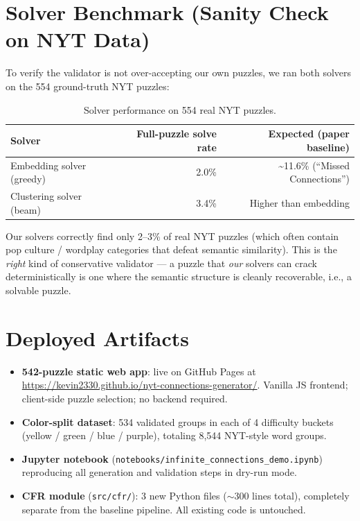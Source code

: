 \documentclass[11pt, letterpaper]{article}
\begin{document}
\section{Solver Benchmark (Sanity Check on NYT Data)}

To verify the validator is not over-accepting our own puzzles, we ran both solvers
on the 554 ground-truth NYT puzzles:

\begin{table}[H]
\centering
\small
\begin{tabular}{lrr}
\toprule
\textbf{Solver} & \textbf{Full-puzzle solve rate} & \textbf{Expected (paper baseline)} \\
\midrule
Embedding solver (greedy) & 2.0\% & \textasciitilde11.6\% (``Missed Connections'') \\
Clustering solver (beam)  & 3.4\% & Higher than embedding \\
\bottomrule
\end{tabular}
\caption{Solver performance on 554 real NYT puzzles.}
\end{table}

Our solvers correctly find only 2--3\% of real NYT puzzles (which often contain pop
culture / wordplay categories that defeat semantic similarity). This is the \emph{right}
kind of conservative validator --- a puzzle that \emph{our} solvers can crack
deterministically is one where the semantic structure is cleanly recoverable, i.e.,
a solvable puzzle.

\section{Deployed Artifacts}

\begin{itemize}[leftmargin=*, itemsep=0.15em]
\item \textbf{542-puzzle static web app}: live on GitHub Pages at
\url{https://kevin2330.github.io/nyt-connections-generator/}.
Vanilla JS frontend; client-side puzzle selection; no backend required.
\item \textbf{Color-split dataset}: 534 validated groups in each of 4 difficulty
buckets (yellow / green / blue / purple), totaling 8{,}544 NYT-style word groups.
\item \textbf{Jupyter notebook} (\texttt{notebooks/infinite\_connections\_demo.ipynb})
reproducing all generation and validation steps in dry-run mode.
\item \textbf{CFR module} (\texttt{src/cfr/}): 3 new Python files ($\sim$300 lines
total), completely separate from the baseline pipeline. All existing code is untouched.
\end{itemize}
\end{document}
